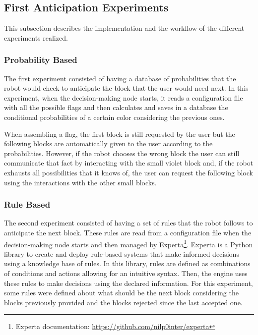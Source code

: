 \subsection{First Anticipation Experiments}
\label{subsection:first_anticipation_experiments}

This subsection describes the implementation and the workflow of the different experiments realized.

\subsubsection{Probability Based}

The first experiment consisted of having a database of probabilities that the robot would check to anticipate the block that the user would need next. In this experiment, when the decision-making node starts, it reads a configuration file with all the possible flags and then calculates and saves in a database the conditional probabilities of a certain color considering the previous ones.

When assembling a flag, the first block is still requested by the user but the following blocks are automatically given to the user according to the probabilities. However, if the robot chooses the wrong block the user can still communicate that fact by interacting with the small violet block and, if the robot exhausts all possibilities that it knows of, the user can request the following block using the interactions with the other small blocks.

\subsubsection{Rule Based}

The second experiment consisted of having a set of rules that the robot follows to anticipate the next block. These rules are read from a configuration file when the decision-making node starts and then managed by Experta\footnote{Experta documentation: \url{https://github.com/nilp0inter/experta}}. Experta is a Python library to create and deploy rule-based systems that make informed decisions using a knowledge base of rules. In this library, rules are defined as combinations of conditions and actions allowing for an intuitive syntax. Then, the engine uses these rules to make decisions using the declared information. For this experiment, some rules were defined about what should be the next block considering the blocks previously provided and the blocks rejected since the last accepted one.

